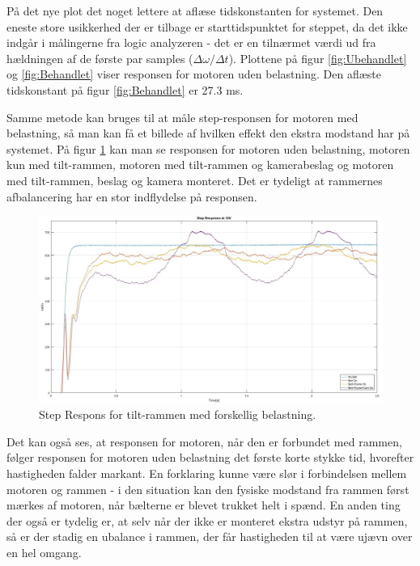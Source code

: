På det nye plot det noget lettere at aflæse tidskonstanten for systemet. Den eneste store usikkerhed der er tilbage er starttidspunktet for steppet, da det ikke indgår i målingerne fra logic analyzeren - det er en tilnærmet værdi ud fra hældningen af de første par samples ($\Delta\omega/\Delta t$). Plottene på figur \ref{fig:Ubehandlet} og \ref{fig:Behandlet} viser responsen for motoren uden belastning. Den aflæste tidskonstant på figur \ref{fig:Behandlet} er 27.3 ms.

Samme metode kan bruges til at måle step-responsen for motoren med belastning, så man kan få et billede af hvilken effekt den ekstra modstand har på systemet. På figur \ref{fig:Combined} kan man se responsen for motoren uden belastning, motoren kun med tilt-rammen, motoren med tilt-rammen og kamerabeslag og motoren med tilt-rammen, beslag og kamera monteret. Det er tydeligt at rammernes afbalancering har en stor indflydelse på responsen.

\begin{figure}[ht]
	\begin{center}
		\includegraphics[scale=0.35]{Billeder/Response_Combined.jpg}
	\end{center}
	\caption{Step Respons for tilt-rammen med forskellig belastning.}
	\label{fig:Combined}
\end{figure}

Det kan også ses, at responsen for motoren, når den er forbundet med rammen, følger responsen for motoren uden belastning det første korte stykke tid, hvorefter hastigheden falder markant. En forklaring kunne være slør i forbindelsen mellem motoren og rammen - i den situation kan den fysiske modstand fra rammen først mærkes af motoren, når bælterne er blevet trukket helt i spænd. En anden ting der også er tydelig er, at selv når der ikke er monteret ekstra udstyr på rammen, så er der stadig en ubalance i rammen, der får hastigheden til at være ujævn over en hel omgang.

